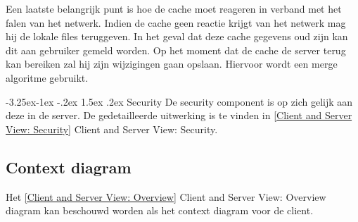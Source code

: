 \documentclass[a4paper,10pt]{article}
\makeatletter
\renewcommand\paragraph{\@startsection{paragraph}{4}{\z@}%
  {-3.25ex\@plus -1ex \@minus -.2ex}%
  {1.5ex \@plus .2ex}%
  {\normalfont\normalsize\bfseries}}
\makeatother
\begin{document}
Een laatste belangrijk punt is hoe de cache moet reageren in verband met het falen van het netwerk.  Indien de cache geen reactie krijgt van het netwerk mag hij de lokale files teruggeven.  In het geval dat deze cache gegevens oud zijn kan dit aan gebruiker gemeld worden.  Op het moment dat de cache de server terug kan bereiken zal hij zijn wijzigingen gaan opslaan.  Hiervoor wordt een merge algoritme gebruikt.

\paragraph{Security}
De security component is op zich gelijk aan deze in de server.  De gedetailleerde uitwerking is te vinden in \ref{Client and Server View: Security} Client and Server View: Security.

\subsection{Context diagram}
Het \ref{Client and Server View: Overview} Client and Server View: Overview diagram kan beschouwd worden als het context diagram voor de client.
\end{document}
